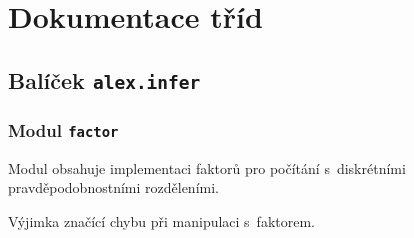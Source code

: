 
\chapter{Dokumentace tříd}
\label{ap:doc}

\section{Balíček \texttt{alex.infer}}
\label{alex.infer::doc}\label{alex.infer:balicek-infer}

\subsection{Modul \texttt{factor}}
\label{alex.infer:modul-factor}\label{alex.infer:module-alex.infer.factor}
Modul {\hyperref[alex.infer:module-alex.infer.factor]{}} obsahuje implementaci faktorů pro počítání s~diskrétními pravděpodobnostními rozděleními.

\begin{fulllineitems}
\label{alex.infer:alex.infer.factor.FactorError}
Výjimka značící chybu při manipulaci s~faktorem.

\end{fulllineitems}


